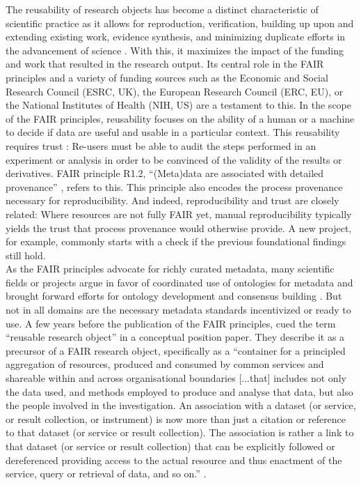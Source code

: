 The reusability of research objects has become a distinct characteristic of scientific practice as it allows for reproduction, verification, building up upon and extending existing work, evidence synthesis, and minimizing duplicate efforts in the advancement of science \citep{thanos2017research}.
With this, it maximizes the impact of the funding and work that resulted in the research output.
Its central role in the \gls{FAIR} principles \citep{wilkinson2016fair} and a variety of funding sources such as the Economic and Social Research Council (ESRC, UK), the European Research Council (ERC, EU), or the National Institutes of Health (NIH, US) are a testament to this.
In the scope of the FAIR principles, reusability focuses on the ability of a human or a machine to decide if data are useful and usable in a particular context.
This reusability requires trust \citep{bechhofer2013linked}: Re-users must be able to audit the steps performed in an experiment or analysis in order to be convinced of the validity of the results or derivatives.
FAIR principle R1.2, ``(Meta)data are associated with detailed provenance'' \citep{wilkinson2016fair}, refers to this.
This principle also encodes the process provenance necessary for reproducibility.
And indeed, reproducibility and trust are closely related:
Where resources are not fully FAIR yet, manual reproducibility typically yields the trust that process provenance would otherwise provide.
A new project, for example, commonly starts with a check if the previous foundational findings still hold.\\
As the FAIR principles advocate for richly curated metadata, many scientific fields or projects argue in favor of coordinated use of ontologies for metadata and brought forward efforts for ontology development and consensus building \citep[e.g.,][]{wise2019implementation, abrams2022standards, papadiamantis2020metadata}.
But not in all domains are the necessary metadata standards incentivized or ready to use.
A few years before the publication of the FAIR principles, \citet{bechhofer2010research} cued the term ``reusable research object'' in a conceptual position paper.
They describe it as a precursor of a FAIR research object, specifically as a ``container for a principled aggregation of resources, produced and consumed by common services and shareable within and across organisational boundaries [...that] includes not only the data used, and methods employed to produce and analyse that data, but also the people involved in the investigation. An association with a dataset (or service, or result collection, or instrument) is now more than just a citation or reference to that dataset (or service or result collection). The association is rather a link to that dataset (or service or result collection) that can be explicitly followed or dereferenced providing access to the actual resource and thus enactment of the service, query or retrieval of data, and so on.'' \citep{bechhofer2010research}.
